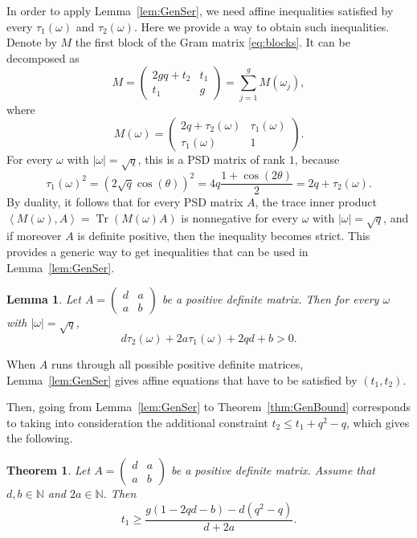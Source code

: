 \documentclass{amsart}
\newtheorem{theorem}[defin]{Theorem}
\newtheorem{lemma}[defin]{Lemma}
\newcommand{\N}{\mathbb{N}}
\DeclareMathOperator{\Tr}{Tr}
\begin{document}
In order to apply Lemma~\ref{lem:GenSer}, we need affine inequalities  satisfied by every $\tau_1(\omega)$ and $\tau_2(\omega)$.
Here we provide a way to obtain such inequalities.
Denote by $M$ the first block of the Gram matrix \eqref{eq:blocks}.
It can be decomposed as
\begin{equation}\label{eq:DecompMomega}
M = \begin{pmatrix}
2gq+t_2 & t_1 \\
t_1 & g 
\end{pmatrix} = \sum_{j=1}^g M(\omega_j),
\end{equation}
where 
\begin{equation}\label{eq:Momega}
M(\omega) = \begin{pmatrix}
2q+\tau_2(\omega) & \tau_1(\omega) \\
\tau_1(\omega) & 1 
\end{pmatrix}.
\end{equation}
For every $\omega$ with $\left| \omega \right| = \sqrt{q}$, this is a PSD matrix of rank $1$, because
\[
\tau_1(\omega)^2 = (2\sqrt{q}\cos(\theta))^2 = 4q \frac{1+\cos(2\theta)}{2}  = 2q + \tau_2(\omega).
\] 
By duality, it follows that for every PSD matrix $A$, the trace inner product $\left\langle M(\omega), A \right\rangle = \Tr(M(\omega)A)$ is nonnegative for every $\omega$ with $\left| \omega \right| = \sqrt{q}$, and if moreover $A$ is definite positive, then the inequality becomes strict.
This provides a generic way to get inequalities that can be used in Lemma~\ref{lem:GenSer}.
\begin{lemma}\label{lem:ineqA2}
Let $A = \begin{pmatrix}
d & a \\ a & b
\end{pmatrix}$ be a positive definite matrix. Then for every $\omega$ with $\left| \omega \right| = \sqrt{q}$,
\[
d\tau_2(\omega) + 2a\tau_1(\omega) + 2qd + b >0.
\]
\end{lemma}
When $A$ runs through all possible positive definite matrices, Lemma~\ref{lem:GenSer} gives affine equations that have to be satisfied by $(t_1,t_2)$. 



Then, going from Lemma~\ref{lem:GenSer} to Theorem~\ref{thm:GenBound} corresponds to taking into consideration the additional constraint $t_2 \leq t_1 + q^2 -q$, which gives the following.
\begin{theorem}\label{thm:boundA2}
Let $A = \begin{pmatrix}
d & a \\ a & b
\end{pmatrix}$ be a positive definite matrix. Assume that $d, b\in \N$ and $2a\in \N$.
Then 
\[
t_1 \geq \frac{g(1-2qd-b)-d(q^2-q)}{d+2a}.
\]
\end{theorem}
\end{document}
